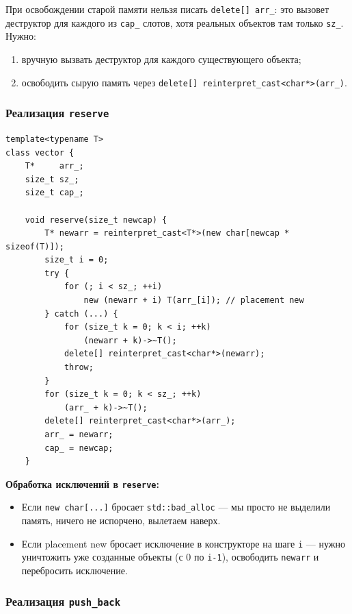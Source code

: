 \documentclass[a4paper,12pt]{article}
\begin{document}
При освобождении старой памяти нельзя писать \texttt{delete[] arr\_}:
это вызовет деструктор для каждого из \texttt{cap\_} слотов, хотя
реальных объектов там только \texttt{sz\_}. Нужно:
\begin{enumerate}
    \item вручную вызвать деструктор для каждого существующего объекта;
    \item освободить сырую память через
          \texttt{delete[] reinterpret\_cast<char*>(arr\_)}.
\end{enumerate}

\subsubsection{Реализация \texttt{reserve}}

\begin{lstlisting}
template<typename T>
class vector {
    T*     arr_;
    size_t sz_;
    size_t cap_;

    void reserve(size_t newcap) {
        T* newarr = reinterpret_cast<T*>(new char[newcap * sizeof(T)]);
        size_t i = 0;
        try {
            for (; i < sz_; ++i)
                new (newarr + i) T(arr_[i]); // placement new
        } catch (...) {
            for (size_t k = 0; k < i; ++k)
                (newarr + k)->~T();
            delete[] reinterpret_cast<char*>(newarr);
            throw;
        }
        for (size_t k = 0; k < sz_; ++k)
            (arr_ + k)->~T();
        delete[] reinterpret_cast<char*>(arr_);
        arr_ = newarr;
        cap_ = newcap;
    }
\end{lstlisting}

\textbf{Обработка исключений в \texttt{reserve}:}
\begin{itemize}
    \item Если \texttt{new char[...]} бросает \texttt{std::bad\_alloc}
          --- мы просто не выделили память, ничего не испорчено, вылетаем наверх.
    \item Если placement new бросает исключение в конструкторе на шаге \texttt{i}
          --- нужно уничтожить уже созданные объекты (с 0 по \texttt{i-1}),
          освободить \texttt{newarr} и перебросить исключение.
\end{itemize}

\subsubsection{Реализация \texttt{push\_back}}
\end{document}
